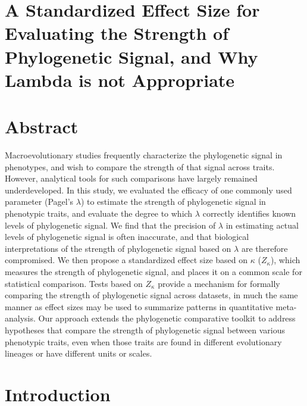 \documentclass[
]{article}
\author{}
\date{\vspace{-2.5em}}
\begin{document}
\hypertarget{a-standardized-effect-size-for-evaluating-the-strength-of-phylogenetic-signal-and-why-lambda-is-not-appropriate}{%
\section{A Standardized Effect Size for Evaluating the Strength of
Phylogenetic Signal, and Why Lambda is not
Appropriate}\label{a-standardized-effect-size-for-evaluating-the-strength-of-phylogenetic-signal-and-why-lambda-is-not-appropriate}}

\hfill\break

\hypertarget{abstract}{%
\section{Abstract}\label{abstract}}

Macroevolutionary studies frequently characterize the phylogenetic
signal in phenotypes, and wish to compare the strength of that signal
across traits. However, analytical tools for such comparisons have
largely remained underdeveloped. In this study, we evaluated the
efficacy of one commonly used parameter (Pagel's \(\lambda\)) to
estimate the strength of phylogenetic signal in phenotypic traits, and
evaluate the degree to which \(\lambda\) correctly identifies known
levels of phylogenetic signal. We find that the precision of \(\lambda\)
in estimating actual levels of phylogenetic signal is often inaccurate,
and that biological interpretations of the strength of phylogenetic
signal based on \(\lambda\) are therefore compromised. We then propose a
standardized effect size based on \(\kappa\) (\(Z_\kappa\)), which
measures the strength of phylogenetic signal, and places it on a common
scale for statistical comparison. Tests based on \(Z_\kappa\) provide a
mechanism for formally comparing the strength of phylogenetic signal
across datasets, in much the same manner as effect sizes may be used to
summarize patterns in quantitative meta-analysis. Our approach extends
the phylogenetic comparative toolkit to address hypotheses that compare
the strength of phylogenetic signal between various phenotypic traits,
even when those traits are found in different evolutionary lineages or
have different units or scales.

\newpage

\hypertarget{introduction}{%
\section{Introduction}\label{introduction}}
\end{document}

